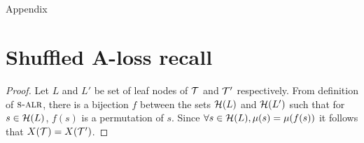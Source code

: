 
~\\~\\
\begin{center}
{\huge{Appendix}}
\end{center}




\section{Shuffled A-loss recall}

\shuffleSameLeafMonomials*
\begin{proof}
Let $L$ and $L'$ be set of leaf nodes of $\mathcal{T}$ and $\mathcal{T}'$ respectively. From definition of $\textsc{s-alr}$, there is a bijection $f$ between the sets $\mathcal{H}(L)$ and $\mathcal{H}(L')$ such that for $s \in \mathcal{H}(L)$, $f(s)$ is a permutation of $s$. Since $\forall s \in \mathcal{H}(L),\mu(s) = \mu(f(s))$ it follows that $X(\mathcal{T}) = X(\mathcal{T}')$. 
\end{proof}


